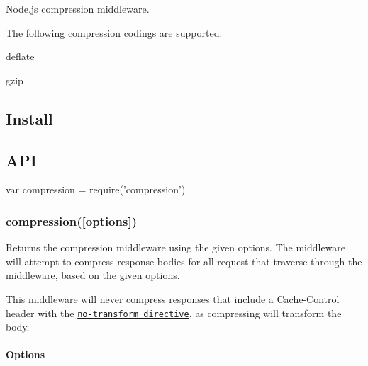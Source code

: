 \href{https://npmjs.org/package/compression}{\tt } \href{https://npmjs.org/package/compression}{\tt } \href{https://travis-ci.org/expressjs/compression}{\tt } \href{https://coveralls.io/r/expressjs/compression?branch=master}{\tt } \href{https://www.gratipay.com/dougwilson/}{\tt }

Node.\+js compression middleware.

The following compression codings are supported\+:


\begin{DoxyItemize}
\item deflate
\item gzip
\end{DoxyItemize}

\subsection*{Install}




\subsection*{A\+PI}


\begin{DoxyCode}
var compression = require('compression')
\end{DoxyCode}


\subsubsection*{compression(\mbox{[}options\mbox{]})}

Returns the compression middleware using the given {\ttfamily options}. The middleware will attempt to compress response bodies for all request that traverse through the middleware, based on the given {\ttfamily options}.

This middleware will never compress responses that include a {\ttfamily Cache-\/\+Control} header with the \href{https://tools.ietf.org/html/rfc7234#section-5.2.2.4}{\tt {\ttfamily no-\/transform} directive}, as compressing will transform the body.

\paragraph*{Options}


